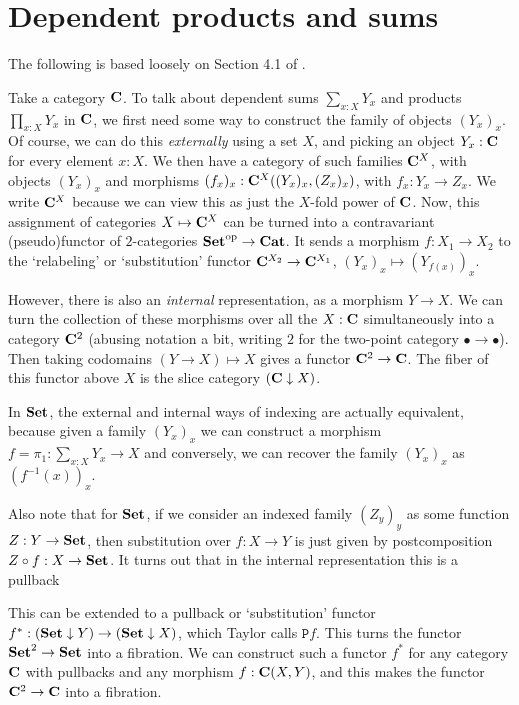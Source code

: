\section{Dependent products and sums}\label{sec:dependent-products}
The following is based loosely on Section 4.1 of \autocite{taylor}.

Take a category $ \mathbf{C} $. To talk about dependent sums $ \sum_{x: X} Y_x $ and products $ \prod_{x: X} Y_x $ in $ \mathbf{C} $, we first need some way to construct the family of objects $ (Y_x)_x $. Of course, we can do this \textit{externally} using a set $ X $, and picking an object $ Y_x : \mathbf{C} $ for every element $ x : X $. We then have a category of such families $ \mathbf{C}^X $, with objects $ (Y_x)_x $ and morphisms $ (f_x)_x: \mathbf{C}^X((Y_x)_x, (Z_x)_x) $, with $ f_x: Y_x \to Z_x $. We write $ \mathbf{C}^X $ because we can view this as just the $ X $-fold power of $ \mathbf{C} $. Now, this assignment of categories $ X \mapsto \mathbf{C}^X $ can be turned into a contravariant (pseudo)functor of $ 2 $-categories $ \mathbf{Set}^{\text{op}} \to \mathbf{Cat} $. It sends a morphism $ f: X_1 \to X_2 $ to the `relabeling' or `substitution' functor $ \mathbf{C}^{X_2} \to \mathbf{C}^{X_1} $, $ (Y_x)_x \mapsto (Y_{f(x)})_x $.

However, there is also an \textit{internal} representation, as a morphism $ Y \to X $. We can turn the collection of these morphisms over all the $ X : \mathbf{C} $ simultaneously into a category $ \mathbf{C}^2 $ (abusing notation a bit, writing $ 2 $ for the two-point category $ \bullet \to \bullet $). Then taking codomains $ (Y \to X) \mapsto X $ gives a functor $ \mathbf{C}^2 \to \mathbf{C} $. The fiber of this functor above $ X $ is the slice category $ (\mathbf{C} \downarrow X) $.

In $ \mathbf{Set} $, the external and internal ways of indexing are actually equivalent, because given a family $ (Y_x)_x $ we can construct a morphism $ f = \pi_1: \sum_{x : X} Y_x \to X $ and conversely, we can recover the family $ (Y_x)_x $ as $ (f^{-1}(x))_x $.

Also note that for $ \mathbf{Set} $, if we consider an indexed family $ (Z_y)_y $ as some function $ Z: Y \to \mathbf{Set} $, then substitution over $ f: X \to Y $ is just given by postcomposition $ Z \circ f: X \to \mathbf{Set} $. It turns out that in the internal representation this is a pullback
\begin{center}
\end{center}
This can be extended to a pullback or `substitution' functor $ f^* : (\mathbf{Set} \downarrow Y) \to (\mathbf{Set} \downarrow X) $, which Taylor calls $ \mathtt{P} f $. This turns the functor $ \mathbf{Set}^2 \to \mathbf{Set} $ into a fibration. We can construct such a functor $ f^* $ for any category $ \mathbf{C} $ with pullbacks and any morphism $ f: \mathbf{C}(X, Y) $, and this makes the functor $ \mathbf{C}^2 \to \mathbf{C} $ into a fibration.

